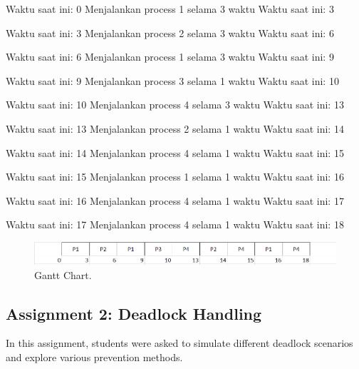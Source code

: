 \documentclass[12pt]{article}
\begin{document}
\begin{python}
    Waktu saat ini: 0
    Menjalankan process 1 selama 3 waktu
    Waktu saat ini: 3

    Waktu saat ini: 3
    Menjalankan process 2 selama 3 waktu
    Waktu saat ini: 6

    Waktu saat ini: 6
    Menjalankan process 1 selama 3 waktu
    Waktu saat ini: 9

    Waktu saat ini: 9
    Menjalankan process 3 selama 1 waktu
    Waktu saat ini: 10

    Waktu saat ini: 10
    Menjalankan process 4 selama 3 waktu
    Waktu saat ini: 13

    Waktu saat ini: 13
    Menjalankan process 2 selama 1 waktu
    Waktu saat ini: 14

    Waktu saat ini: 14
    Menjalankan process 4 selama 1 waktu
    Waktu saat ini: 15

    Waktu saat ini: 15
    Menjalankan process 1 selama 1 waktu
    Waktu saat ini: 16

    Waktu saat ini: 16
    Menjalankan process 4 selama 1 waktu
    Waktu saat ini: 17

    Waktu saat ini: 17
    Menjalankan process 4 selama 1 waktu
    Waktu saat ini: 18
\end{python}

\begin{figure}[h]
    \centering
    \includegraphics[width=\textwidth]{asset/gantt-chart-a1.png}
    \caption{Gantt Chart.}
    \label{fig:gantt-chart-kelompok7-assignment1}
\end{figure}


\subsection{Assignment 2: Deadlock Handling}
In this assignment, students were asked to simulate different deadlock scenarios and explore various prevention methods.
\end{document}
